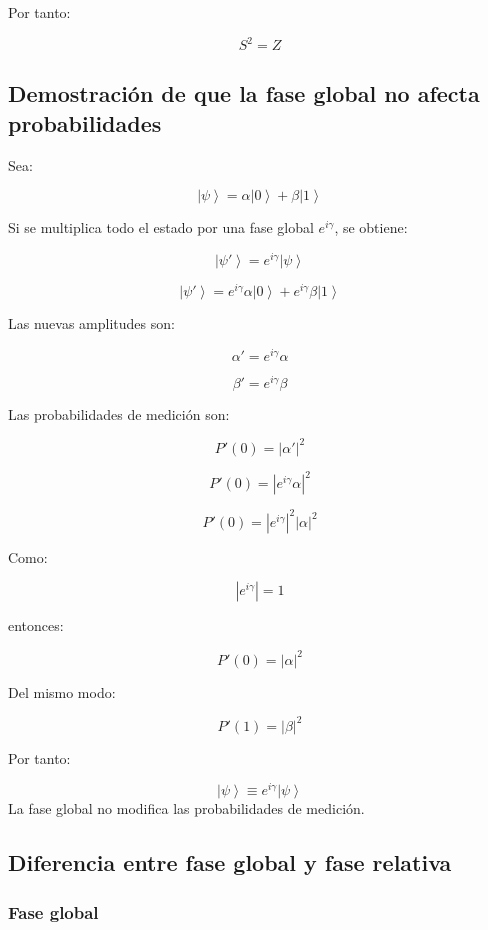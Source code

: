 \documentclass[12pt,a4paper]{article}
\newcommand{\ket}[1]{\left|#1\right\rangle}
\begin{document}
Por tanto:

\begin{resultado}
\[
\boxed{S^2=Z}
\]
\end{resultado}

\subsection{Demostración de que la fase global no afecta probabilidades}

Sea:

\[
\ket{\psi}=\alpha\ket{0}+\beta\ket{1}
\]

Si se multiplica todo el estado por una fase global \(e^{i\gamma}\), se obtiene:

\[
\ket{\psi'}=e^{i\gamma}\ket{\psi}
\]

\[
\ket{\psi'}=e^{i\gamma}\alpha\ket{0}+e^{i\gamma}\beta\ket{1}
\]

Las nuevas amplitudes son:

\[
\alpha'=e^{i\gamma}\alpha
\]

\[
\beta'=e^{i\gamma}\beta
\]

Las probabilidades de medición son:

\[
P'(0)=|\alpha'|^2
\]

\[
P'(0)=|e^{i\gamma}\alpha|^2
\]

\[
P'(0)=|e^{i\gamma}|^2|\alpha|^2
\]

Como:

\[
|e^{i\gamma}|=1
\]

entonces:

\[
P'(0)=|\alpha|^2
\]

Del mismo modo:

\[
P'(1)=|\beta|^2
\]

Por tanto:

\begin{resultado}
\[
\boxed{\ket{\psi}\equiv e^{i\gamma}\ket{\psi}}
\]
La fase global no modifica las probabilidades de medición.
\end{resultado}

\subsection{Diferencia entre fase global y fase relativa}

\subsubsection*{Fase global}
\end{document}
